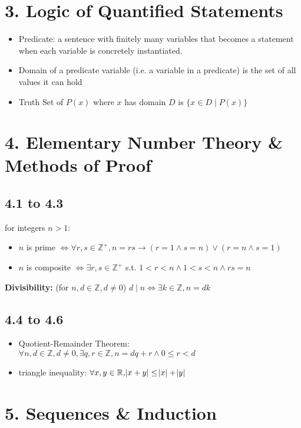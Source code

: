 \documentclass[8pt,landscape]{article}
\begin{document}
\begin{multicols*}{4}
		\section*{3. Logic of Quantified Statements}
		\begin{itemize}[leftmargin=*]
			\item Predicate: a sentence with finitely many variables that becomes a statement when each variable is concretely instantiated.
			\item Domain of a predicate variable (i.e. a variable in a predicate) is the set of all values it can hold
			\item Truth Set of $P(x)$ where $x$ has domain $D$ is $\{x \in D \mid P(x)\}$
			\end{itemize}
		\section*{4. Elementary Number Theory \& Methods of Proof}
		\subsection*{4.1 to 4.3}
		for integers $n>1:$
		\begin{itemize}[leftmargin=*]
		\item $n$ is prime $\Leftrightarrow \forall r,s \in\mathbb{Z^{+}}, n=rs \rightarrow (r=1 \land s=n) \lor (r=n \land s=1)$
		\item $n$ is composite $\Leftrightarrow \exists r,s \in\mathbb{Z^{+}}$ s.t. $1<r<n \land 1<s<n \land rs=n$
		\end{itemize}
		\textbf{Divisibility:} (for $n,d \in\mathbb{Z}, d\neq0$) $d\mid n \Leftrightarrow \exists k\in\mathbb{Z}, n=dk$
		\subsection*{4.4 to 4.6}
		\begin{itemize}[leftmargin=*]
			\item Quotient-Remainder Theorem:$\forall n,d \in\mathbb{Z}, d\neq0, \exists q,r \in\mathbb{Z}, n=dq+r \land 0\leq r< d$
			\item triangle inequality: $\forall x, y \in\mathbb{R}, \abs{x+y} \leq \abs{x}+\abs{y}$
		 \end{itemize}
		 
		\section*{5. Sequences \& Induction}
		

\end{multicols*}
\end{document}
